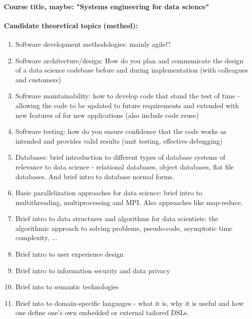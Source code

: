 \documentclass[oneside,final,10pt]{article}
\begin{document}
\paragraph{Course title, maybe: "Systems engineering for data science"}
\paragraph{Candidate theoretical topics (method):}
\begin{enumerate}
\item Software development methodologies: mainly agile!?
\item Software architecture/design: How do you plan and communicate the design of a data science codebase before and during implementation (with colleagues and customers)
\item Software maintainability: how to develop code that stand the test of time - allowing the code to be updated to future requirements and extended with new features of for new applications (also include code reuse)
\item Software testing: how do you ensure confidence that the code works as intended and provides valid results (unit testing, effective debugging)
\item Databases: brief introduction to different types of database systems of relevance to data science - relational databases, object databases, flat file databases. And brief intro to database normal forms.
\item Basic parallelization approaches for data science: brief intro to multithreading, multiprocessing and MPI. Also approaches like map-reduce.
\item Brief intro to data structures and algorithms for data scientists: the algorithmic approach to solving problems, pseudo-code, asymptotic time complexity, ...
\item Brief intro to user experience design
\item Brief intro to information security and data privacy
\item Brief into to semantic technologies
\item Brief into to domain-specific languages - what it is, why it is useful and how one define one's own embedded or external tailored DSLs.
\end{enumerate}
\end{document}
